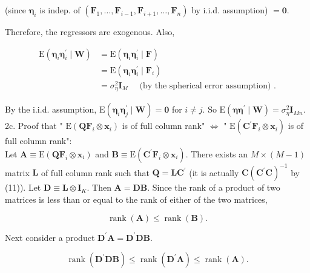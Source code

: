 \documentclass[10pt]{article}
\begin{document}
(since $\boldsymbol{\eta}_{i}$ is indep. of $\left(\mathbf{F}_{1}, \ldots, \mathbf{F}_{i-1}, \mathbf{F}_{i+1}, \ldots, \mathbf{F}_{n}\right)$ by i.i.d. assumption) $=\mathbf{0}$.

Therefore, the regressors are exogenous. Also,

$$
\begin{aligned}
\mathrm{E}\left(\boldsymbol{\eta}_{i} \boldsymbol{\eta}_{i}^{\prime} \mid \mathbf{W}\right) & =\mathrm{E}\left(\boldsymbol{\eta}_{i} \boldsymbol{\eta}_{i}^{\prime} \mid \mathbf{F}\right) \\
& =\mathrm{E}\left(\boldsymbol{\eta}_{i} \boldsymbol{\eta}_{i}^{\prime} \mid \mathbf{F}_{i}\right) \\
& =\sigma_{\eta}^{2} \mathbf{I}_{M} \quad \text { (by the spherical error assumption) } .
\end{aligned}
$$

By the i.i.d. assumption, $\mathrm{E}\left(\boldsymbol{\eta}_{i} \boldsymbol{\eta}_{j}^{\prime} \mid \mathbf{W}\right)=\mathbf{0}$ for $i \neq j$. So $\mathrm{E}\left(\boldsymbol{\eta} \boldsymbol{\eta}^{\prime} \mid \mathbf{W}\right)=\sigma_{\eta}^{2} \mathbf{I}_{M n}$.\\
2c. Proof that " $\mathrm{E}\left(\mathbf{Q} \mathbf{F}_{i} \otimes \mathbf{x}_{i}\right)$ is of full column rank" $\Leftrightarrow$ " $\mathrm{E}\left(\mathbf{C}^{\prime} \mathbf{F}_{i} \otimes \mathbf{x}_{i}\right)$ is of full column rank":\\
Let $\mathbf{A} \equiv \mathrm{E}\left(\mathbf{Q} \mathbf{F}_{i} \otimes \mathbf{x}_{i}\right)$ and $\mathbf{B} \equiv \mathrm{E}\left(\mathbf{C}^{\prime} \mathbf{F}_{i} \otimes \mathbf{x}_{i}\right)$. There exists an $M \times(M-1)$ matrix $\mathbf{L}$ of full column rank such that $\mathbf{Q}=\mathbf{L} \mathbf{C}^{\prime}$ (it is actually $\mathbf{C}\left(\mathbf{C}^{\prime} \mathbf{C}\right)^{-1}$ by (11)). Let $\mathbf{D} \equiv \mathbf{L} \otimes \mathbf{I}_{K}$. Then $\mathbf{A}=\mathbf{D B}$. Since the rank of a product of two matrices is less than or equal to the rank of either of the two matrices,


\begin{equation*}
\operatorname{rank}(\mathbf{A}) \leq \operatorname{rank}(\mathbf{B}) . \tag{1}
\end{equation*}


Next consider a product $\mathbf{D}^{\prime} \mathbf{A}=\mathbf{D}^{\prime} \mathbf{D B}$.


\begin{equation*}
\operatorname{rank}\left(\mathbf{D}^{\prime} \mathbf{D B}\right) \leq \operatorname{rank}\left(\mathbf{D}^{\prime} \mathbf{A}\right) \leq \operatorname{rank}(\mathbf{A}) . \tag{2}
\end{equation*}
\end{document}
